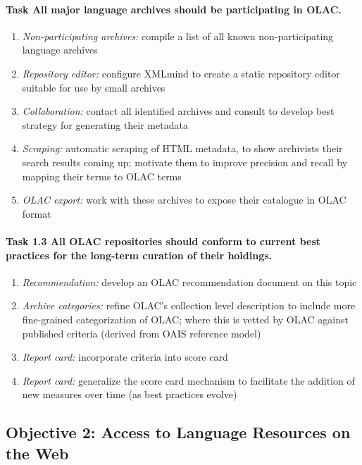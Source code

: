 \paragraph{Task {\task} All major language archives should be participating in OLAC.}

\begin{enumerate}[label=\emph{\task\alph*}]
\item \emph{Non-participating archives:}
  compile a list of all known non-participating language archives
\item \emph{Repository editor:}
  configure XMLmind to create a static repository editor suitable
  for use by small archives
\item \emph{Collaboration:}
  contact all identified archives and consult to develop best
  strategy for generating their metadata
\item \emph{Scraping:}
  automatic scraping of HTML metadata, to show archivists
  their search results coming up; motivate them to improve precision
  and recall by mapping their terms to OLAC terms
\item \emph{OLAC export:}
  work with these archives to expose their catalogue in OLAC format
\end{enumerate}

\def\task{1.3}
\paragraph{Task {\task} All OLAC repositories should conform to current best practices
      for the long-term curation of their holdings.}

\begin{enumerate}[label=\emph{\task\alph*}]
\item \emph{Recommendation:}
  develop an OLAC recommendation document on this topic
\item \emph{Archive categories:}
  refine OLAC's collection level description to include
  more fine-grained categorization of OLAC; where this is vetted
  by OLAC against published criteria (derived from OAIS reference model)
\item \emph{Report card:}
  incorporate criteria into score card
\item \emph{Report card:}
  generalize the score card mechanism to facilitate the addition
  of new measures over time (as best practices evolve)
\end{enumerate}

\subsection*{Objective 2: Access to Language Resources on the Web}

